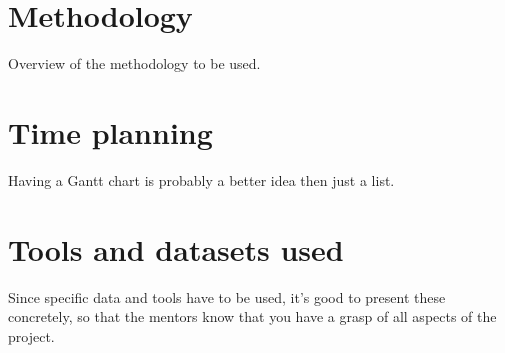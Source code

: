 \section{Methodology}
Overview of the methodology to be used.

\section{Time planning}
Having a Gantt chart is probably a better idea then just a list.


\section{Tools and datasets used}
Since specific data and tools have to be used, it’s good to present these concretely, 
so that the mentors know that you have a grasp of all aspects of the project.
